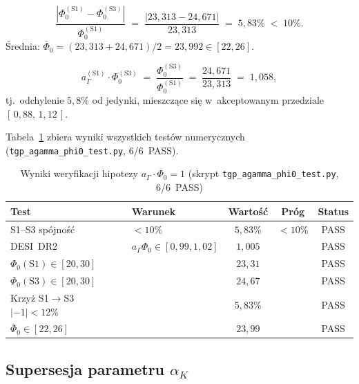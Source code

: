 \begin{proposition}%
\label{prop:W-S1S3-consistency}
\begin{equation}
  \frac{|\Phi_0^{(\mathrm{S1})} - \Phi_0^{(\mathrm{S3})}|}%
       {\Phi_0^{(\mathrm{S1})}}
  \;=\; \frac{|23{,}313 - 24{,}671|}{23{,}313}
  \;=\; 5{,}83\%
  \;<\; 10\%.
\end{equation}
\'{S}rednia:
$\bar\Phi_0 = (23{,}313 + 24{,}671)/2 = 23{,}992 \in [22, 26]$.
\end{proposition}

\begin{proposition}%
\label{prop:W-cross-check}
\begin{equation}
  a_\Gamma^{(\mathrm{S1})} \cdot \Phi_0^{(\mathrm{S3})}
  \;=\; \frac{\Phi_0^{(\mathrm{S3})}}{\Phi_0^{(\mathrm{S1})}}
  \;=\; \frac{24{,}671}{23{,}313}
  \;=\; 1{,}058,
\end{equation}
tj.\ odchylenie $5{,}8\%$ od jedynki, mieszcz\k{a}ce si\k{e}
w~akceptowanym przedziale $[\,0{,}88,\,1{,}12\,]$.
\end{proposition}

Tabela~\ref{tab:W-results} zbiera wyniki wszystkich test\'ow
numerycznych (\texttt{tgp\_agamma\_phi0\_test.py}, 6/6~PASS).

\begin{table}[h]
\centering
\caption{Wyniki weryfikacji hipotezy $a_\Gamma\cdot\Phi_0=1$
  (skrypt \texttt{tgp\_agamma\_phi0\_test.py}, 6/6~PASS)}
\label{tab:W-results}
\begin{tabular}{llccc}
\hline
Test & Warunek & Warto\'{s}\'{c} & Pr\'og & Status \\
\hline
S1--S3 sp\'ojno\'{s}\'{c} & $<10\%$ & $5{,}83\%$ & $<10\%$ & PASS \\
DESI~DR2 & $a_\Gamma\Phi_0\in[0{,}99,1{,}02]$ & $1{,}005$ & & PASS \\
$\Phi_0(\mathrm{S1})\in[20,30]$ & & $23{,}31$ & & PASS \\
$\Phi_0(\mathrm{S3})\in[20,30]$ & & $24{,}67$ & & PASS \\
Krzy\.z S1$\to$S3 $|{-}1|<12\%$ & & $5{,}83\%$ & & PASS \\
$\bar\Phi_0\in[22,26]$ & & $23{,}99$ & & PASS \\
\hline
\end{tabular}
\end{table}

\subsection{Supersesja parametru $\alpha_K$}%
\label{app:W-supersession}

